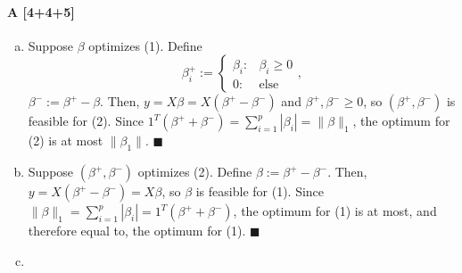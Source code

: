 \documentclass[11pt]{article}
\newcommand{\qed}{\quad \ensuremath{\blacksquare}}      %
\begin{document}
\paragraph{A [4+4+5]}
\begin{enumerate}[(a)]
\item Suppose $\beta$ optimizes (1). Define
\[\beta^+_i
    := \left\{
        \begin{array}{cc}
            \beta_i : & \beta_i \geq 0  \\
            0 : & \mbox{else}
        \end{array}
       \right.,
\]
$\beta^- := \beta^+ - \beta$. Then, $y = X\beta = X(\beta^+ - \beta^-)$
and $\beta^+,\beta^- \geq 0$, so $(\beta^+,\beta^-)$ is feasible for (2). Since
$1^T(\beta^+ + \beta^-) = \sum_{i = 1}^p |\beta_i| = \|\beta\|_1$, the optimum
for (2) is at most $\|\beta_1\|$. \qed

\item Suppose $(\beta^+,\beta^-)$ optimizes (2). Define
$\beta := \beta^+ - \beta^-$. Then, $y = X(\beta^+ - \beta^-) = X\beta$, so
$\beta$ is feasible for (1). Since
$\|\beta\|_1 = \sum_{i = 1}^p |\beta_i| = 1^T(\beta^+ + \beta^-)$, the optimum
for (1) is at most, and therefore equal to, the optimum for (1). \qed

\item
\end{enumerate}
\end{document}
